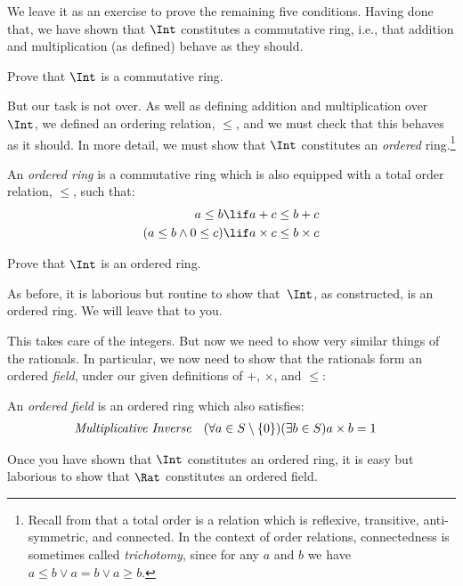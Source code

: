 \documentclass[../../../include/open-logic-section]{subfiles}
\begin{document}
We leave it as an exercise to prove the remaining five conditions.
Having done that, we have shown that $\Int$ constitutes a commutative
ring, i.e., that addition and multiplication (as defined) behave as
they should.

\begin{prob}
Prove that $\Int$ is a commutative ring.
\end{prob}

But our task is not over. As well as defining addition and
multiplication over $\Int$, we defined an ordering relation, $\leq$,
and we must check that this behaves as it should. In more detail, we
must show that $\Int$ constitutes an \emph{ordered} ring.\footnote{Recall
	from  that a total order
	is a relation which is reflexive, transitive, anti-symmetric, and connected. 
	In the context of order relations, connectedness is sometimes called
	\emph{trichotomy}, since for any $a$ and $b$ we have $a \leq b \lor a
	= b \lor a \geq b$.} 

\begin{defn}
An \emph{ordered ring} is a commutative ring which is also equipped
with a total order relation, $\leq$, such that:
\begin{align*}
	a \leq b &\lif a + c \leq b + c\\
	(a \leq b \land 0 \leq c) &\lif a \times c \leq b \times c
\end{align*}
\end{defn}

\begin{prob}
Prove that $\Int$ is an ordered ring. 
\end{prob}

As before, it is laborious but routine to show that~$\Int$, as
constructed, is an ordered ring. We will leave that to you.

This takes care of the integers. But now we need to show very similar
things of the rationals. In particular, we now need to show that the
rationals form an ordered \emph{field}, under our given definitions of
$+$, $\times$, and $\leq$:
\begin{defn}
An \emph{ordered field} is an ordered ring which also satisfies:
\begin{align*}
	\emph{Multiplicative Inverse}& & (\forall a \in S \setminus \{0\})(\exists b \in S) a\times b& = 1
\end{align*}
\end{defn}

Once you have shown that $\Int$ constitutes an ordered ring, it is
easy but laborious to show that $\Rat$ constitutes an ordered field.
\end{document}
